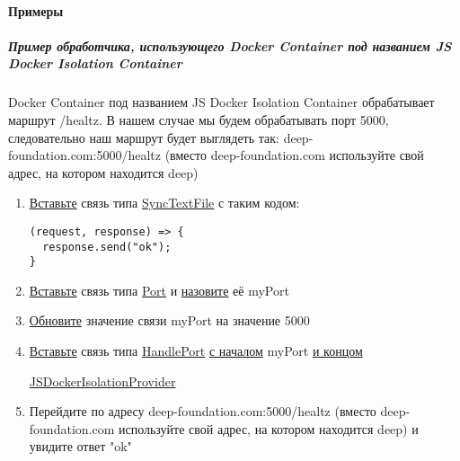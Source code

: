 \paragraph{Примеры}
\subparagraph{Пример обработчика, использующего Docker Container под названием
  JS Docker Isolation Container}
Docker Container под названием JS Docker Isolation Container обрабатывает
маршрут /healtz. В нашем случае мы будем обрабатывать порт 5000, следовательно
наш маршрут будет выглядеть так: deep-foundation.com:5000/healtz (вместо
deep-foundation.com используйте свой адрес, на котором находится deep)
\begin{enumerate}
  \item \hyperlink{DeepCase.InsertLink.Description}{Вставьте} связь типа
        \hyperlink{Core.SyncTextFile.Description}{SyncTextFile} с таким
        кодом:
        \begin{lstlisting}
(request, response) => {
  response.send("ok");
}
\end{lstlisting}
  \item \hyperlink{DeepCase.InsertLink.Description}{Вставьте} связь типа
        \hyperlink{Core.Port.Description}{Port} и
        \hyperlink{FAQ.HowToSetName}{назовите} её myPort
  \item \hyperlink{DeepCase.UpdateLink.Description}{Обновите} значение
        связи
        myPort на значение 5000
  \item \hyperlink{DeepCase.InsertLink.Description}{Вставьте} связь типа
        \hyperlink{Core.HandlePort.Description}{HandlePort}
        \hyperlink{FAQ.HowToInsertLinkWithFromAndTo}{с началом}
        myPort \hyperlink{FAQ.HowToInsertLinkWithFromAndTo}{и концом}

        \hyperlink{Core.JSDockerIsolationProvider.Description}{JSDockerIsolationProvider}
  \item Перейдите по адресу deep-foundation.com:5000/healtz (вместо
        deep-foundation.com используйте свой адрес, на котором находится
        deep) и
        увидите ответ "ok" %
\end{enumerate}

